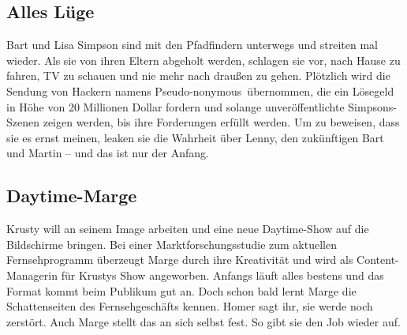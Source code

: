 \subsection{Alles Lüge}
Bart und Lisa Simpson sind mit den Pfadfindern unterwegs und streiten mal wieder. Als sie von ihren Eltern abgeholt werden, schlagen sie vor, nach Hause zu fahren, TV zu schauen und nie mehr nach draußen zu gehen. Plötzlich wird die Sendung von Hackern namens \glqq Pseudo-nonymous\grqq\ übernommen, die ein Lösegeld in Höhe von 20 Millionen Dollar fordern und solange unveröffentlichte Simpsons-Szenen zeigen werden, bis ihre Forderungen erfüllt werden. Um zu beweisen, dass sie es ernst meinen, leaken sie die Wahrheit über Lenny, den zukünftigen Bart und Martin -- und das ist nur der Anfang.


\subsection{Daytime-Marge}
Krusty will an seinem Image arbeiten und eine neue Daytime-Show auf die Bildschirme bringen. Bei einer Marktforschungsstudie zum aktuellen Fernsehprogramm überzeugt Marge durch ihre Kreativität und wird als Content-Managerin für Krustys Show angeworben. Anfangs läuft alles bestens und das Format kommt beim Publikum gut an. Doch schon bald lernt Marge die Schattenseiten des Fernsehgeschäfts kennen. Homer sagt ihr, sie werde noch zerstört. Auch Marge stellt das an sich selbst fest. So gibt sie den Job wieder auf.


